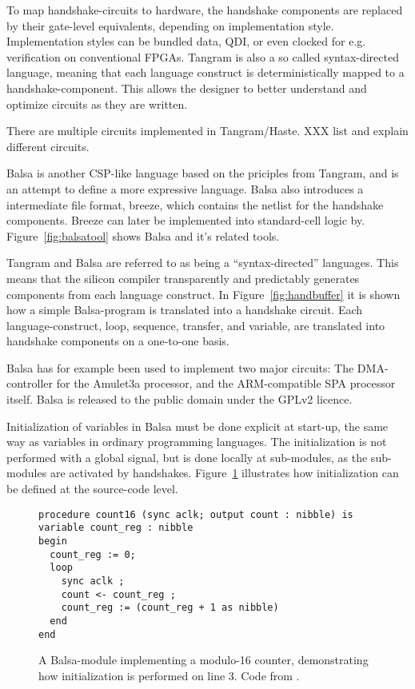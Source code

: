To map handshake-circuits to hardware, the handshake components are
replaced by their gate-level equivalents, depending on implementation
style. Implementation styles can be bundled data, QDI, or even clocked
for e.g. verification on conventional FPGAs. Tangram is also a so
called syntax-directed language, meaning that each language construct
is deterministically mapped to a handshake-component. This allows the
designer to better understand and optimize circuits as they are
written.

There are multiple circuits implemented in Tangram/Haste. XXX list and
explain different circuits.

Balsa\cite{tut} is another CSP-like language based on the priciples
from Tangram, and is an attempt to define a more expressive
language. Balsa also introduces a intermediate file format, breeze,
which contains the netlist for the handshake components. Breeze can
later be implemented into standard-cell logic
by. Figure~\ref{fig:balsatool} shows Balsa and it's related tools.

Tangram and Balsa are referred to as being a ``syntax-directed''
languages. This means that the silicon compiler transparently and
predictably generates components from each language construct. In
Figure~\ref{fig:handbuffer} it is shown how a simple Balsa-program is
translated into a handshake circuit. Each language-construct, loop,
sequence, transfer, and variable, are translated into handshake
components on a one-to-one basis.

Balsa has for example been used to implement two major circuits: The
DMA-controller for the Amulet3a processor, and the ARM-compatible SPA
processor itself. Balsa is released to the public domain under the
GPLv2 licence.

\label{par:init}
Initialization of variables in Balsa must be done explicit at
start-up, the same way as variables in ordinary programming
languages. The initialization is not performed with a global signal,
but is done locally at sub-modules, as the sub-modules are activated
by handshakes. Figure~\ref{fig:init} illustrates how initialization
can be defined at the source-code level.

\begin{figure}[htbp]
\begin{lstlisting}
procedure count16 (sync aclk; output count : nibble) is
variable count_reg : nibble
begin
  count_reg := 0;
  loop
    sync aclk ;
    count <- count_reg ;
    count_reg := (count_reg + 1 as nibble)
  end
end
\end{lstlisting}
\caption{A Balsa-module implementing a modulo-16 counter,
  demonstrating how initialization is performed on line 3. Code from
  \cite{tut}.}
\label{fig:init}
\end{figure}


